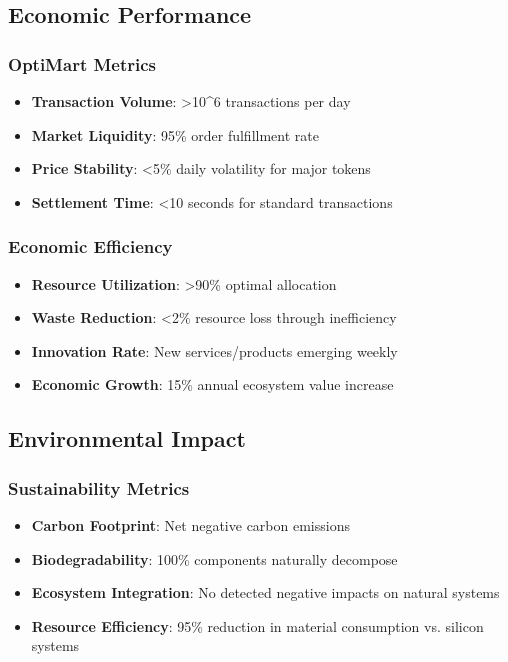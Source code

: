 \documentclass[11pt,a4paper]{article}
\begin{document}
\subsection{Economic Performance}

\subsubsection{OptiMart Metrics}
\begin{itemize}
    \item \textbf{Transaction Volume}: >10\^{}6 transactions per day
    \item \textbf{Market Liquidity}: 95\% order fulfillment rate
    \item \textbf{Price Stability}: <5\% daily volatility for major tokens
    \item \textbf{Settlement Time}: <10 seconds for standard transactions
\end{itemize}

\subsubsection{Economic Efficiency}
\begin{itemize}
    \item \textbf{Resource Utilization}: >90\% optimal allocation
    \item \textbf{Waste Reduction}: <2\% resource loss through inefficiency
    \item \textbf{Innovation Rate}: New services/products emerging weekly
    \item \textbf{Economic Growth}: 15\% annual ecosystem value increase
\end{itemize}

\subsection{Environmental Impact}

\subsubsection{Sustainability Metrics}
\begin{itemize}
    \item \textbf{Carbon Footprint}: Net negative carbon emissions
    \item \textbf{Biodegradability}: 100\% components naturally decompose
    \item \textbf{Ecosystem Integration}: No detected negative impacts on natural systems
    \item \textbf{Resource Efficiency}: 95\% reduction in material consumption vs. silicon systems
\end{itemize}
\end{document}
